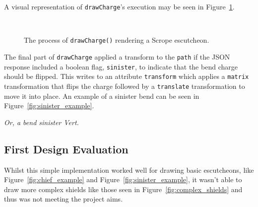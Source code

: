 \documentclass[nobib, a4paper, twoside, justified]{tufte-book}
\makeatletter
\newcommand{\charge}{\gls{charge}\@\xspace}
\makeatother
\begin{document}
A visual representation of \texttt{drawCharge}'s execution may be seen in
Figure~\ref{fig:draw_charge}.

\begin{figure}
  \centering
  \qquad
  \\
  \qquad
  \caption{The process of \texttt{drawCharge()} rendering a Scrope \gls{escutcheon}.}%
  \label{fig:draw_charge}
\end{figure}

The final part of \texttt{drawCharge} applied a transform to the \texttt{path} if the JSON response
included a boolean flag, \texttt{sinister}, to indicate that the bend \charge should be flipped.
This writes to an attribute \texttt{transform} which applies a \texttt{matrix} transformation that
flips the \charge followed by a \texttt{translate} transformation to move it into place. An
example of a sinister bend can be seen in Figure~\ref{fig:sinister_example}.

\begin{marginfigure}
  \centering
  \def\svgwidth{0.8\linewidth}
  
  \caption{\textit{Or, a bend sinister Vert.}}\label{fig:sinister_example}
\end{marginfigure}

\subsection{First Design Evaluation}%
\label{sub:first_design_evaluation}

Whilst this simple implementation worked well for drawing basic \glspl{escutcheon}, like
Figure~\ref{fig:chief_example} and Figure~\ref{fig:sinister_example}, it wasn't able to draw more
complex shields like those seen in Figure~\ref{fig:complex_shields} and thus was not meeting the
project aims.
\end{document}
